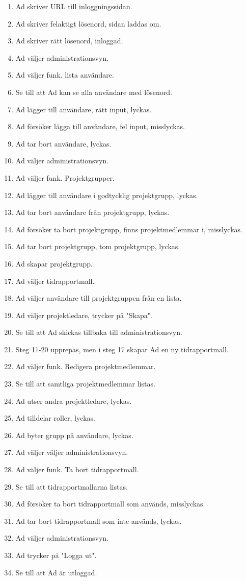 \documentclass[a4paper]{article}
\begin{document}
\begin{FT}
\begin{enumerate}
\item Ad skriver URL till inloggningssidan.
\item Ad skriver felaktigt lösenord, sidan laddas om.
\item Ad skriver rätt lösenord, inloggad.
\item Ad väljer administrationsvyn.
\item Ad väljer funk. lista användare.
\item Se till att Ad kan se alla användare med lösenord.
\item Ad lägger till användare, rätt input, lyckas.
\item Ad försöker lägga till användare, fel input, misslyckas.
\item Ad tar bort användare, lyckas.
\item Ad väljer administrationsvyn.
\item Ad väljer funk. Projektgrupper.
\item Ad lägger till användare i godtycklig projektgrupp, lyckas.
\item Ad tar bort användare från projektgrupp, lyckas.
\item Ad försöker ta bort projektgrupp, finns projektmedlemmar i, misslyckas.
\item Ad tar bort projektgrupp, tom projektgrupp, lyckas.
\item Ad skapar projektgrupp.
\item Ad väljer tidrapportmall.
\item Ad väljer användare till projektgruppen från en lista.
\item Ad väljer projektledare, trycker på "Skapa".
\item Se till att Ad skickas tillbaka till administrationsvyn.
\item Steg 11-20 upprepas, men i steg 17 skapar Ad en ny tidrapportmall.
\item Ad väljer funk. Redigera projektmedlemmar.
\item Se till att samtliga projektmedlemmar listas.
\item Ad utser andra projektledare, lyckas.
\item Ad tilldelar roller, lyckas.
\item Ad byter grupp på användare, lyckas.
\item Ad väljer väljer administrationsvyn.
\item Ad väljer funk. Ta bort tidrapportmall.
\item Se till att tidrapportmallarna listas.
\item Ad försöker ta bort tidrapportmall som används, misslyckas.
\item Ad tar bort tidrapportmall som inte används, lyckas.
\item Ad väljer administrationsvyn.
\item Ad trycker på "Logga ut".
\item Se till att Ad är utloggad.


\end{enumerate}
\end{FT}
\end{document}
